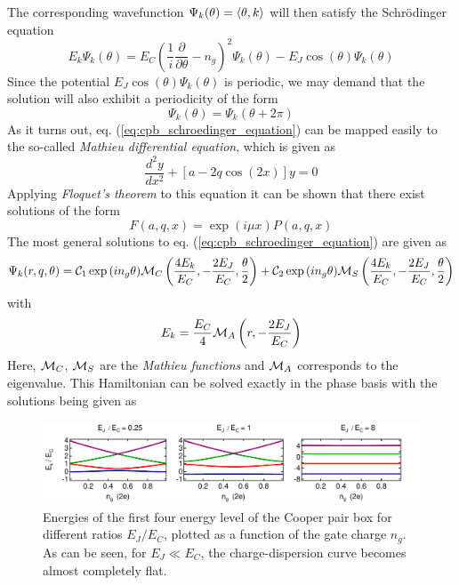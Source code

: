 The corresponding wavefunction $\Psi_k(\theta) = \left< \theta,k \right>$ will then satisfy the Schrödinger equation
%
\begin{equation}
E_k \Psi_k(\theta) = E_C(\frac{1}{i}\frac{\partial}{\partial \theta}-n_g)^2 \Psi_k(\theta) - E_J \cos{\left(\theta\right)}\Psi_k(\theta) \label{eq:cpb_schroedinger_equation}
\end{equation}
%
Since the potential $E_J\cos{(\theta)}\Psi_k(\theta)$ is periodic, we may demand that the solution will also exhibit a periodicity of the form
%
\begin{equation}
\Psi_k(\theta) = \Psi_k(\theta+2\pi)
\end{equation}
%
As it turns out, eq. (\ref{eq:cpb_schroedinger_equation}) can be mapped easily to the so-called {\it Mathieu differential equation}, which is given as
%
\begin{equation}
\frac{d^2y}{dx^2}+\left[a-2q\cos{(2x)}\right]y = 0
\end{equation}
%
Applying {\it Floquet's theorem} to this equation it can be shown that there exist solutions of the form
%
\begin{equation}
F(a,q,x) = \exp{\left(i\mu x\right)}P(a,q,x)
\end{equation}
%
The most general solutions to eq. (\ref{eq:cpb_schroedinger_equation}) are given as \citep{cottet_implementation_2002}
%
\begin{equation}
\Psi_k(r,q,\theta) = \mcal{C}_1\exp{\left(i n_g \theta \right)}\mcal{M}_C\left(\frac{4E_k}{E_C},-\frac{2E_J}{E_C},\frac{\theta}{2}\right)+\mcal{C}_2\exp{\left(i n_g \theta \right)}\mcal{M}_S \left(\frac{4 E_k}{E_C},-\frac{2 E_J}{E_C},\frac{\theta}{2}\right)
\end{equation}
%
with 
%
\begin{equation}
E_k = \frac{E_C}{4}\mcal{M}_A \left(r,-\frac{2 E_J}{E_C} \right)
\end{equation}
%
Here, $\mcal{M}_C$, $\mcal{M}_S$ are the {\it Mathieu functions} and $\mcal{M}_A$ corresponds to the eigenvalue.
This Hamiltonian can be solved exactly in the phase basis with the solutions being given as\citep{koch_charge-insensitive_2007,cottet_implementation_2002}

\begin{figure}[ht!]
	\includegraphics[width=\textwidth]{"./material/mathematica/cooper_pair_box_energies"}
	\caption{Energies of the first four energy level of the Cooper pair box for different ratios $E_J/E_C$, plotted as a function of the gate charge $n_g$. As can be seen, for $E_J \ll E_C$, the charge-dispersion curve becomes almost completely flat.}
	\label{fig:CooperPairBoxEnergies}
\end{figure}

